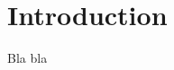\documentclass[jair,twoside,11pt,theapa]{article}
\begin{document}
\section{Introduction}
\label{sec:intro}

Bla bla~\cite{Lanctot13MCMS}






\end{document}
